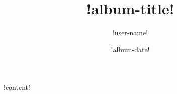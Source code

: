 \documentclass[a4,14pt]{report}
\begin{document}
{\fontsize{12pt}{1em}

\title{!album-title!}
\author{!user-name!}
\date{!album-date!}
\maketitle
\tableofcontents
\newpage

!content!
}
\end{document}
